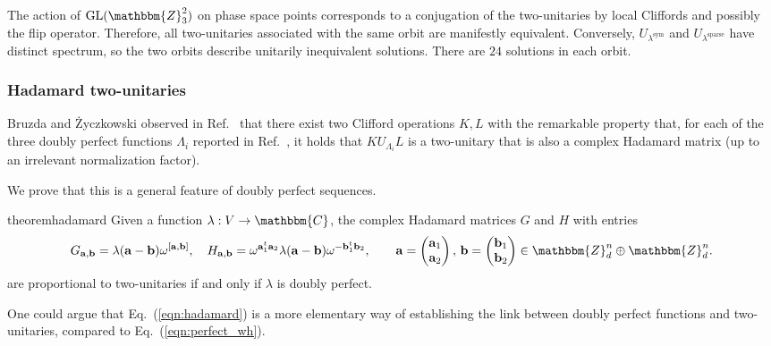 \documentclass[aps,nofootinbib,floatfix,a4paper]{revtex4}
\newcommand{\sym}{^\mathrm{sym}}
\newcommand{\sparse}{^\mathrm{sparse}}
\newcommand{\1}{\mbox{$\mathbf{1}$}}
\def\ZZ{\mathbbm{Z}}
\def\CC{\mathbbm{C}}
\DeclareMathOperator{\GL}{GL}
\renewcommand{\vec}{\mathbf}
\begin{document}
The action of $\GL(\ZZ_3^2)$ on phase space points corresponds to a conjugation of the two-unitaries by local Cliffords and possibly the flip operator. 
Therefore, all two-unitaries associated with the same orbit are manifestly equivalent.
Conversely, $U_{\lambda\sym}$ and $U_{\lambda\sparse}$ have distinct spectrum, so the two orbits describe unitarily inequivalent solutions. %
There are $24$ solutions in each orbit.


\subsubsection{Hadamard two-unitaries}

Bruzda and {\.Z}yczkowski observed in Ref.~\cite{Bruzda2025Twounitary} that there exist two Clifford operations $K, L$ with the remarkable property that, for each of the three doubly perfect functions $\Lambda_i$ reported in Ref.~\cite{Rather2024Construction}, it holds that  $K U_{\Lambda_i} L$ is a two-unitary that is also a complex Hadamard matrix (up to an irrelevant normalization factor).

We prove that this is a general feature of doubly perfect sequences.

\begin{restatable}{theorem}{hadamard}\label{thm:hadamard}
	Given a function $\lambda: V \to \CC$, the complex Hadamard matrices $G$ and $H$ with entries
	\begin{align}\label{eqn:hadamard}
		G_{\vec a, \vec b} = \lambda(\vec a - \vec b) \omega^{[\vec a, \vec b]},
		\quad
		H_{\vec a, \vec b} = \omega^{\vec a_1^t \vec a_2 } \lambda(\vec a - \vec b) \omega^{- \vec b_1^t \vec b_2},
		\qquad
		\vec a = 
		\begin{pmatrix} 
			\vec a_1\\
			\vec a_2
		\end{pmatrix},
		\,
		\vec b = 
		\begin{pmatrix} 
			\vec b_1\\
			\vec b_2
		\end{pmatrix}
		\in \ZZ_d^n \oplus \ZZ_d^n.
	\end{align}
	are proportional to two-unitaries if and only if $\lambda$ is doubly perfect. %
\end{restatable}

One could argue that Eq.~(\ref{eqn:hadamard}) is a more elementary way of establishing the link between doubly perfect functions and two-unitaries, compared to Eq.~(\ref{eqn:perfect_wh}).
\end{document}
